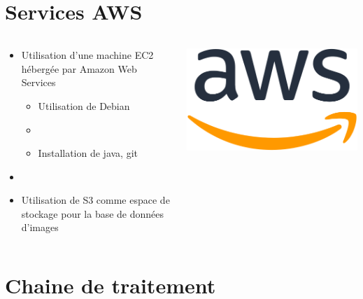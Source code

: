 \documentclass[8pt,aspectratio=169,hyperref={unicode=true}]{beamer}
\begin{document}
\section{Services AWS}
\begin{frame}{\insertsection}
  \begin{columns}
    \begin{column}{.6\textwidth}
      \begin{itemize}
        \item Utilisation d'une machine EC2 hébergée par Amazon Web Services
              \begin{itemize}
                \item Utilisation de Debian
                \item[]
                \item Installation de java, git
              \end{itemize}
        \item[]
        \item Utilisation de S3 comme espace de stockage pour la base de données d'images
      \end{itemize}
    \end{column}
    \begin{column}{.4\textwidth}
      \center
      \includegraphics[width=.8\textwidth]{./512px-Amazon_Web_Services_Logo.svg.png}
    \end{column}
  \end{columns}
\end{frame}

\section{Chaine de traitement}
\end{document}
